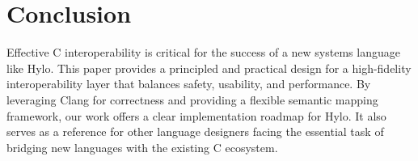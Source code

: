 \section{Conclusion}
\label{sec:conclusion}

Effective C interoperability is critical for the success of a new systems language like Hylo. This paper provides a principled and practical design for a high-fidelity interoperability layer that balances safety, usability, and performance. By leveraging Clang for correctness and providing a flexible semantic mapping framework, our work offers a clear implementation roadmap for Hylo. It also serves as a reference for other language designers facing the essential task of bridging new languages with the existing C ecosystem.
